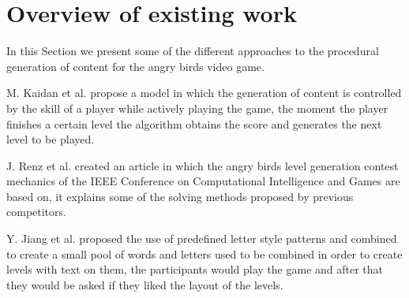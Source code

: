 \documentclass[conference]{IEEEtran}
\begin{document}











\section{Overview of existing work}

In this Section we present some of the different approaches to the procedural
generation of content for the angry birds video game.

M. Kaidan et al. \cite{Kaidan2015} propose a model in which the generation of
content is controlled by the skill of a player while actively playing the game,
the moment the player finishes a certain level the algorithm obtains the score
and generates the next level to be played.

J. Renz et al. \cite{Renz} created an article in which the angry birds level
generation contest mechanics of the IEEE Conference on Computational
Intelligence and Games are based on, it explains some of the solving methods
proposed by previous competitors.

Y. Jiang et al. \cite{Jiang2017} proposed the use of predefined letter style
patterns and combined to create a small pool of words and letters used to be combined in
order to create levels with text on them, the participants would play the game
and after that they would be asked if they liked the layout of the levels.
\end{document}
